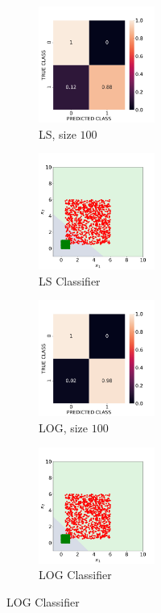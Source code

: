 \documentclass[12pt, a4 paper]{article}
\begin{document}
\begin{figure}[!htbp]
    \begin{subfigure}[!htbp]{0.2\textwidth}
       \centering
       \includegraphics[width=1.5in]{../results/ex1/acc_LS_dataset_Uniform_size_100.pdf}
       \caption{LS, size $100$}
       \label{fig:LS_P1a_100}
    \end{subfigure}
\quad
    \begin{subfigure}[!htbp]{0.2\textwidth}
       \centering
       \includegraphics[width=1.5in]{../results/ex1/samples_LS_dataset_Uniform_size_100.pdf}
       \caption{LS Classifier}
       \label{fig:LSD_P1a_100}
    \end{subfigure}
\quad
    \begin{subfigure}[!htbp]{0.2\textwidth}
       \centering
       \includegraphics[width=1.5in]{../results/ex1/acc_LOG_dataset_Uniform_size_100.pdf}
       \caption{LOG, size $100$}
       \label{fig:LOG_P1a_100}
    \end{subfigure}
\quad
    \begin{subfigure}[!htbp]{0.2\textwidth}
       \centering
       \includegraphics[width=1.5in]{../results/ex1/samples_LOG_dataset_Uniform_size_100.pdf}
       \caption{LOG Classifier}
       \label{fig:LOGD_P1a_100}
    \end{subfigure} 
    

\end{figure}
\end{document}
